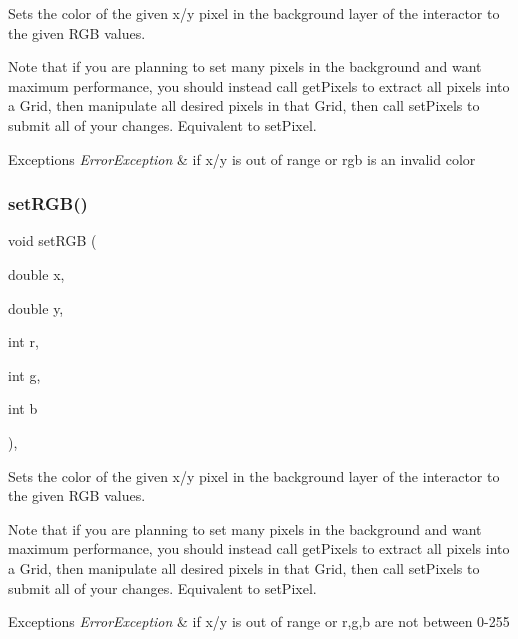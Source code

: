 Sets the color of the given x/y pixel in the background layer of the interactor to the given R\+GB values. 

Note that if you are planning to set many pixels in the background and want maximum performance, you should instead call get\+Pixels to extract all pixels into a Grid, then manipulate all desired pixels in that Grid, then call set\+Pixels to submit all of your changes. Equivalent to set\+Pixel.


\begin{DoxyExceptions}{Exceptions}
{\em Error\+Exception} & if x/y is out of range or rgb is an invalid color \\
\hline
\end{DoxyExceptions}
\mbox{\label{classGDrawingSurface_a81202471d4fc9f2015aef0bc073acfab}} 
\subsubsection{\texorpdfstring{set\+R\+G\+B()}{setRGB()}\hspace{0.1cm}{\footnotesize\ttfamily [2/3]}}
{\footnotesize\ttfamily void set\+R\+GB (\begin{DoxyParamCaption}\item[{double}]{x,  }\item[{double}]{y,  }\item[{int}]{r,  }\item[{int}]{g,  }\item[{int}]{b }\end{DoxyParamCaption})\hspace{0.3cm}{\ttfamily [virtual]}, {\ttfamily [inherited]}}



Sets the color of the given x/y pixel in the background layer of the interactor to the given R\+GB values. 

Note that if you are planning to set many pixels in the background and want maximum performance, you should instead call get\+Pixels to extract all pixels into a Grid, then manipulate all desired pixels in that Grid, then call set\+Pixels to submit all of your changes. Equivalent to set\+Pixel.


\begin{DoxyExceptions}{Exceptions}
{\em Error\+Exception} & if x/y is out of range or r,g,b are not between 0-\/255 \\
\hline
\end{DoxyExceptions}
\mbox{\label{classGDrawingSurface_ae9a228792d4bb4b628350f39eaa3ad12}} 
